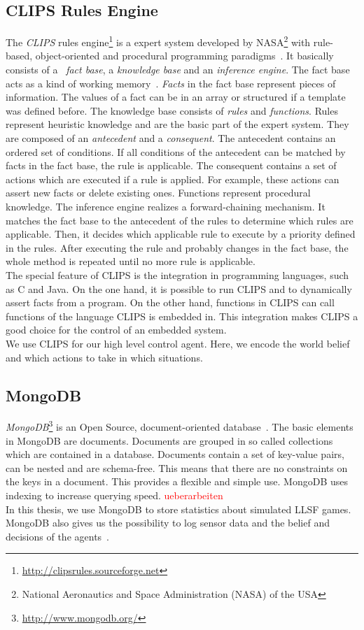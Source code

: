 \subsection{CLIPS Rules Engine}
The \textit{CLIPS} rules engine\footnote{\url{http://clipsrules.sourceforge.net}} is a expert system developed by NASA\footnote{National Aeronautics and Space Administration (NASA) of the USA} with rule-based, object-oriented and procedural programming paradigms~\cite{Clips,clips_manual}. It basically consists of a ~\textit{fact base}, a \textit{knowledge base} and an \textit{inference engine}. The fact base acts as a kind of working memory~\cite{Incremental}. \textit{Facts} in the fact base represent pieces of information. The values of a fact can be in an array or structured if a template was defined before. The knowledge base consists of \textit{rules} and \textit{functions}. Rules represent heuristic knowledge and are the basic part of the expert system. They are composed of an \textit{antecedent} and a \textit{consequent}. The antecedent contains an ordered set of conditions. If all conditions of the antecedent can be matched by facts in the fact base, the rule is applicable. The consequent contains a set of actions which are executed if a rule is applied. For example, these actions can assert new facts or delete existing ones. Functions represent procedural knowledge. The inference engine realizes a forward-chaining mechanism. It matches the fact base to the antecedent of the rules to determine which rules are applicable. Then, it decides which applicable rule to execute by a priority defined in the rules. After executing the rule and probably changes in the fact base, the whole method is repeated until no more rule is applicable.\\
The special feature of CLIPS is the integration in programming languages, such as C and Java. On the one hand, it is possible to run CLIPS and to dynamically assert facts from a program. On the other hand, functions in CLIPS can call functions of the language CLIPS is embedded in. This integration makes CLIPS a good choice for the control of an embedded system.\\
We use CLIPS for our high level control agent. Here, we encode the world belief and which actions to take in which situations.

\subsection{MongoDB}
\textit{MongoDB}\footnote{\url{http://www.mongodb.org/}} is an Open Source, document-oriented database~\cite{mongodb,KlingenDA}. The basic elements in MongoDB are documents. Documents are grouped in so called collections which are contained in a database. Documents contain a set of key-value pairs, can be nested and are schema-free. This means that there are no constraints on the keys in a document. This provides a flexible and simple use. MongoDB uses indexing to increase querying speed. \textcolor{red}{ueberarbeiten}\\
In this thesis, we use MongoDB to store statistics about simulated LLSF games. MongoDB also gives us the possibility to log sensor data and the belief and decisions of the agents~\cite{KlingenDA}.
